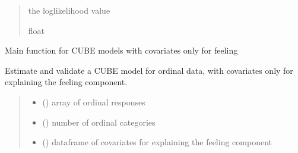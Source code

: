 \documentclass[letterpaper,10pt,english]{sphinxmanual}
\begin{document}
\begin{fulllineitems}
\begin{quote}
\begin{description}
\begin{itemize}
\end{itemize}

\sphinxAtStartPar
the log\sphinxhyphen{}likelihood value

\sphinxAtStartPar
float

\end{description}\end{quote}

\end{fulllineitems}


\begin{fulllineitems}
\label{\detokenize{cubmods:cubmods.cube_0w0.mle}}
\pysigstartsignatures
{}
\pysigstopsignatures
\sphinxAtStartPar
Main function for CUBE models with covariates only for feeling

\sphinxAtStartPar
Estimate and validate a CUBE model for ordinal data, with covariates only for explaining the
feeling component.
\begin{quote}\begin{description}
\begin{itemize}
\item {} 
\sphinxAtStartPar
{} () \textendash{} array of ordinal responses

\item {} 
\sphinxAtStartPar
{} () \textendash{} number of ordinal categories

\item {} 
\sphinxAtStartPar
{} () \textendash{} dataframe of covariates for explaining the feeling component


\end{itemize}
\end{description}
\end{quote}
\end{fulllineitems}
\end{document}
